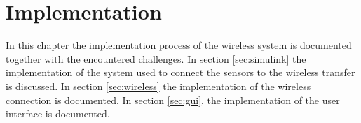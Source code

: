 \chapter{Implementation}
\label{ch:imp}
In this chapter the implementation process of the wireless system is documented together with the encountered challenges. In section \ref{sec:simulink}  the implementation of the system used to connect the sensors to the wireless transfer is discussed. In section \ref{sec:wireless} the implementation of the wireless connection is documented. In section \ref{sec:gui}, the implementation of the user interface is documented.


\pagebreak

\pagebreak

\pagebreak